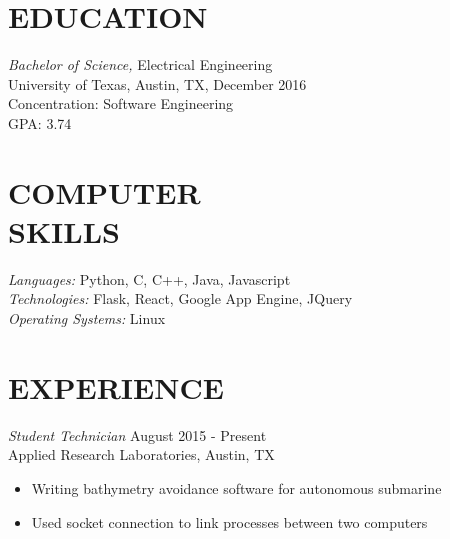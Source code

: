 \documentclass[margin,11pt]{res}
\begin{document}
\address{800 W 38th St, Apt. 01210
      \\ Austin, TX 78705
	  \\ (512) 897-7446}
\address{philliplemons512@gmail.com
      \\ www.philliplemons.com}

\begin{resume}

\section{EDUCATION} {\sl Bachelor of Science,} Electrical Engineering \\
                University of Texas, Austin, TX,
                December 2016 \\
                Concentration: Software Engineering \\
                GPA: 3.74


\section{COMPUTER \\ SKILLS} {\sl Languages:} Python, C, C++, Java,
                Javascript \\
                {\sl Technologies:} Flask, React, Google App Engine, JQuery \\
                {\sl Operating Systems:} Linux

\section{EXPERIENCE}
    {\sl Student Technician} \hfill            August 2015 - Present \\
    Applied Research Laboratories, Austin, TX
    \begin{itemize}  \itemsep -2pt %
        \item Writing bathymetry avoidance software for autonomous submarine
        \item Used socket connection to link processes between two computers
    \end{itemize}


\end{resume}
\end{document}
